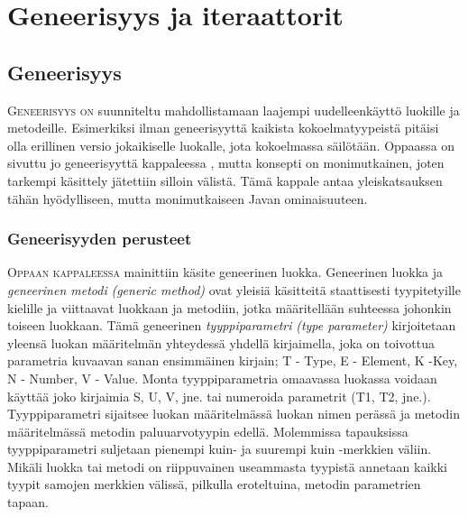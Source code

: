 \documentclass[openany]{book}
\newcommand{\newthought}[1]{\smallskip\textsc{#1}}
\newcommand{\eng}[1]{\textit{(#1)}}
\newcommand{\new}[1]{\textit{\gls{#1}}}
\newcommand{\neweng}[2]{\new{#1} \eng{#2}}
\begin{document}

\chapter{Geneerisyys ja iteraattorit}
\label{generic+iterator}

\section{Geneerisyys}
\label{generic}

\newthought{Geneerisyys on} suunniteltu mahdollistamaan laajempi uudelleenkäyttö luokille ja
metodeille. Esimerkiksi ilman geneerisyyttä kaikista kokoelmatyypeistä pitäisi olla erillinen
versio jokaikiselle luokalle, jota kokoelmassa säilötään. Oppaassa on sivuttu jo geneerisyyttä
kappaleessa , mutta konsepti on monimutkainen, joten tarkempi käsittely
jätettiin silloin välistä. Tämä kappale antaa yleiskatsauksen tähän hyödylliseen, mutta
monimutkaiseen Javan ominaisuuteen.

\subsection{Geneerisyyden perusteet}
\label{genericBasics}

\newthought{Oppaan kappaleessa}  mainittiin käsite \gls{geneerinen luokka}. 
Geneerinen luokka ja \neweng{geneerinen metodi}{generic method} ovat yleisiä käsitteitä
staattisesti tyypitetyille kielille ja viittaavat luokkaan ja metodiin, jotka määritellään
suhteessa johonkin toiseen luokkaan. Tämä geneerinen \neweng{tyyppiparametri}{type parameter}
kirjoitetaan yleensä luokan määritelmän yhteydessä yhdellä kirjaimella, joka on toivottua
parametria kuvaavan sanan ensimmäinen kirjain; T - Type, E - Element, K -Key, N - Number, V -
Value. Monta tyyppiparametria omaavassa luokassa voidaan käyttää joko kirjaimia S, U, V, jne. tai
numeroida parametrit (T1, T2, jne.). Tyyppiparametri sijaitsee luokan määritelmässä luokan nimen
perässä ja metodin määritelmässä metodin paluuarvotyypin edellä. Molemmissa tapauksissa
tyyppiparametri suljetaan pienempi kuin- ja suurempi kuin -merkkien väliin. Mikäli luokka tai
metodi on riippuvainen useammasta tyypistä annetaan kaikki tyypit samojen merkkien välissä,
pilkulla eroteltuina, metodin parametrien tapaan. 
\end{document}
